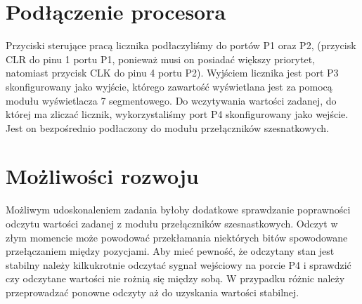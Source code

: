 \documentclass[fleqn]{article}
\begin{document}
\pagebreak

\section{Podłączenie procesora}


Przyciski sterujące pracą licznika podłaczyliśmy do portów P1 oraz P2, (przycisk CLR do pinu 1 portu P1, ponieważ musi on posiadać większy priorytet, natomiast przycisk CLK do pinu 4 portu P2). Wyjściem licznika jest port P3 skonfigurowany jako wyjście, którego zawartość wyświetlana jest za pomocą modułu wyświetlacza 7 segmentowego. Do wczytywania wartości zadanej, do której ma zliczać licznik, wykorzystaliśmy port P4 skonfigurowany jako wejście. Jest on bezpośrednio podłaczony do modułu przełączników szesnatkowych.

\section{Możliwości rozwoju}

Możliwym udoskonaleniem zadania byłoby dodatkowe sprawdzanie poprawności odczytu wartości zadanej z modułu przełączników szesnastkowych. Odczyt w złym momencie może powodować przekłamania niektórych bitów spowodowane przełączaniem między pozycjami. Aby mieć pewność, że odczytany stan jest stabilny należy kilkukrotnie odczytać sygnał wejściowy na porcie P4 i sprawdzić czy odczytane wartości nie rożnią się między sobą. W przypadku różnic należy przeprowadzać ponowne odczyty aż do uzyskania wartości stabilnej.
\end{document}
